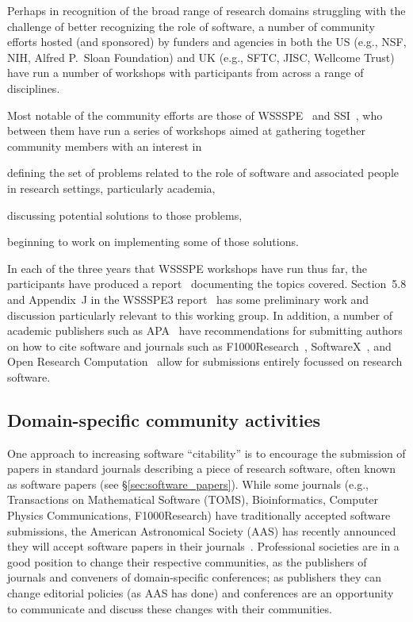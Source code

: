 \documentclass[11pt, oneside]{amsart}
\begin{document}
Perhaps in recognition of the broad range of research domains struggling with
the challenge of better recognizing the role of software, a number of community
efforts hosted (and sponsored) by funders and agencies in both the US (e.g.,
NSF, NIH, Alfred P.\ Sloan Foundation) and UK (e.g., SFTC, JISC, Wellcome Trust)
have run a number of workshops with participants from across a range of
disciplines.

Most notable of the community efforts are those of WSSSPE~\cite{wssspe} and
SSI~\cite{ssi-workshops}, who between them have run a series of workshops aimed
at gathering together community members with an interest in
\begin{enumerate*}[series=InlineList, before=\hspace{-0.6ex}]
    \item defining the set
of problems related to the role of software and associated people in research
settings, particularly academia,
    \item discussing potential solutions to those
problems,
\item beginning to work on implementing some of those solutions.
  \end{enumerate*}
In each of the three years that WSSSPE workshops have run thus far, the
participants have produced a report~\cite{WSSSPE1,WSSSPE2,WSSSPE3} documenting
the topics covered. Section~5.8 and Appendix~J in the WSSSPE3
report~\cite{WSSSPE3} has some preliminary work and discussion particularly
relevant to this working group.  In addition, a number of academic publishers
such as APA~\cite{APA-guidelines} have recommendations for submitting authors on
how to cite software and journals such as F1000Research~\cite{F1000},
SoftwareX~\cite{softwareX}, and Open Research Computation~\cite{softwareX} allow
for submissions entirely focussed on research software.

\subsection{Domain-specific community activities}

One approach to increasing software ``citability'' is to encourage the
submission of papers in standard journals describing a piece of research
software, often known as software papers (see \S\ref{sec:software_papers}).
While some journals (e.g., Transactions on Mathematical Software (TOMS),
Bioinformatics, Computer Physics Communications, F1000Research) have
traditionally accepted software submissions, the American Astronomical Society
(AAS) has recently announced they will accept software papers in their
journals~\cite{aas-sofware-papers}. Professional societies are in a good
position to change their respective communities, as the publishers of journals
and conveners of domain-specific conferences; as publishers they can change
editorial policies (as AAS has done) and conferences are an opportunity to
communicate and discuss these changes with their communities.
\end{document}
